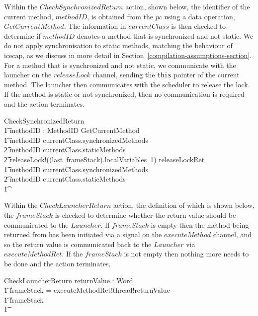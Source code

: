 Within the $CheckSynchronizedReturn$ action, shown below, the
identifier of the current method, $methodID$, is obtained from the
$pc$ using a data operation, $GetCurrentMethod$.
The information in $currentClass$ is then checked to determine if
$methodID$ denotes a method that is synchronized and not static.
We do not apply synchronisation to static methods, matching the
behaviour of icecap, as we discuss in more detail in
Section~\ref{compilation-assumptions-section}. 
For a method that is synchronized and not static, we communicate with
the launcher on the $releaseLock$ channel, sending the \texttt{this}
pointer of the current method.
The launcher then communicates with the scheduler to release the lock.
If the method is static or not synchronized, then no communication is
required and the action terminates.
\begin{circusaction}
  CheckSynchronizedReturn \circdef \\
  \t1 \circvar methodID : MethodID \circspot \lschexpract GetCurrentMethod \rschexpract \circseq \\
  \t1 \circif methodID \in currentClass.synchronizedMethods \\
  \t2 \land methodID \notin currentClass.staticMethods \circthen {} \\
  \t2 releaseLock!((last~frameStack).localVariables~1) \then releaseLockRet \then \Skip \\
  \t1 {} \circelse methodID \notin currentClass.synchronizedMethods \\
  \t2 {} \lor methodID \in currentClass.staticMethods \circthen \Skip \\
  \t1 \circfi
\end{circusaction}

Within the $CheckLauncherReturn$ action, the definition of which is
shown below, the $frameStack$ is checked to determine whether the
return value should be communicated to the $Launcher$.
If $frameStack$ is empty then the method being returned from has been
initiated via a signal on the $executeMethod$ channel, and so the
return value is communicated back to the $Launcher$ via
$executeMethodRet$. 
If the $frameStack$ is not empty then nothing more needs to be done
and the action terminates.
\begin{circusaction}
  CheckLauncherReturn \circdef \circval returnValue : Word \circspot \\
  \t1 \circif frameStack = \emptyset \circthen executeMethodRet!thread!returnValue \then \Skip \\
  \t1 {} \circelse frameStack \neq \emptyset \circthen \Skip \\
  \t1 \circfi
\end{circusaction}

